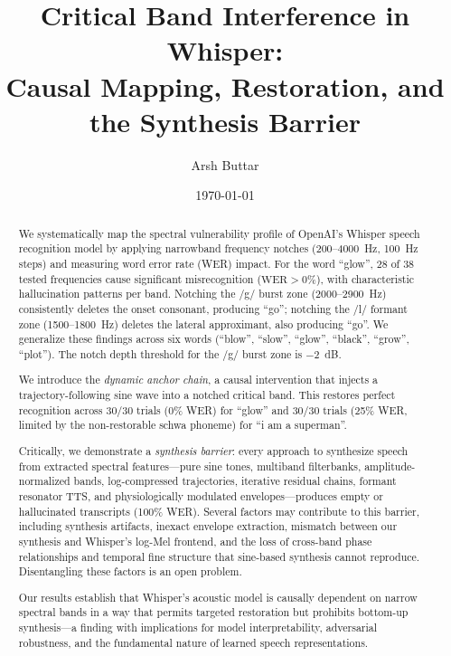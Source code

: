 \documentclass[11pt,a4paper]{article}
\title{Critical Band Interference in Whisper: \\
       Causal Mapping, Restoration, and the Synthesis Barrier}
\author{Arsh Buttar}
\date{\today}
\begin{document}
\maketitle

\begin{abstract}
We systematically map the spectral vulnerability profile of OpenAI's Whisper
speech recognition model by applying narrowband frequency notches (200--4000~Hz,
100~Hz steps) and measuring word error rate (WER) impact. For the word
``glow'', 28 of 38 tested frequencies cause significant misrecognition
($\text{WER}>0\%$), with characteristic hallucination patterns per band.
Notching the /g/ burst zone (2000--2900~Hz) consistently deletes the onset
consonant, producing ``go''; notching the /l/ formant zone (1500--1800~Hz)
deletes the lateral approximant, also producing ``go''. We generalize these
findings across six words (``blow'', ``slow'', ``glow'', ``black'', ``grow'',
``plot''). The notch depth threshold for the /g/ burst zone is $-2$~dB.

We introduce the \emph{dynamic anchor chain}, a causal intervention that injects
a trajectory-following sine wave into a notched critical band. This restores
perfect recognition across 30/30 trials (0\% WER) for ``glow'' and 30/30 trials
(25\% WER, limited by the non-restorable schwa phoneme) for ``i am a superman''.

Critically, we demonstrate a \emph{synthesis barrier}: every approach to
synthesize speech from extracted spectral features---pure sine tones, multiband
filterbanks, amplitude-normalized bands, log-compressed trajectories, iterative
residual chains, formant resonator TTS, and physiologically modulated
envelopes---produces empty or hallucinated transcripts (100\% WER). Several factors may contribute to this barrier, including
synthesis artifacts, inexact envelope extraction, mismatch between our
synthesis and Whisper's log-Mel frontend, and the loss of cross-band phase
relationships and temporal fine structure that sine-based synthesis cannot
reproduce. Disentangling these factors is an open problem.

Our results establish that Whisper's acoustic model is causally dependent on
narrow spectral bands in a way that permits targeted restoration but prohibits
bottom-up synthesis---a finding with implications for model interpretability,
adversarial robustness, and the fundamental nature of learned speech
representations.
\end{abstract}

\end{document}

